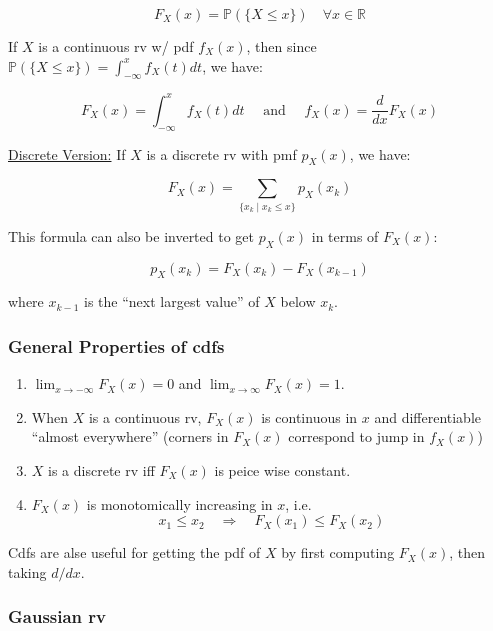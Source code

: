 \documentclass{article}
\begin{document}
\begin{equation}
  \tag{Cdf Definition: Continuous}
  \boxed{
    F_X(x) = \mathbb{P}(\{X\leq x\}) \quad \forall x \in \mathbb{R}
  }
\end{equation}

If $X$ is a continuous rv w/ pdf $f_X(x)$, then since
$\mathbb{P}(\{X\leq x\}) = \int_{-\infty}^x f_X(t)dt$, we have:

\[
  F_X(x) = \int_{-\infty}^x f_X(t)dt \quad \text{ and } \quad
  f_X(x) = \frac{d}{dx} F_X(x)
\]

\underline{Discrete Version:} If $X$ is a discrete rv with pmf $p_X(x)$,
we have:

\begin{equation}
  \tag{Cdf Definition: Discrete}
  \boxed{
    F_X(x) = \sum_{\{x_k \mid x_k \leq x\}} p_X(x_k)
  }
\end{equation}

This formula can also be inverted to get $p_X(x)$ in terms of
$F_X(x)$:

\[
  p_X(x_k) = F_X(x_k) - F_X(x_{k-1})
\]

where $x_{k-1}$ is the ``next largest value'' of $X$ below $x_k$.

\subsubsection{General Properties of cdfs}

\begin{enumerate}
\item $\lim_{x\to-\infty}F_X(x) = 0$ and $\lim_{x\to\infty}F_X(x) = 1$.
  
\item When $X$ is a continuous rv, $F_X(x)$ is continuous in $x$ and
  differentiable ``almost everywhere'' (corners in $F_X(x)$ correspond
  to jump in $f_X(x)$)

\item $X$ is a discrete rv iff $F_X(x)$ is peice wise constant.

\item $F_X(x)$ is monotomically increasing in $x$, i.e.
  \[
    x_1 \leq x_2 \quad \Rightarrow \quad F_X(x_1) \leq F_X(x_2)
  \]
\end{enumerate}

Cdfs are alse useful for getting the pdf of $X$ by first computing
$F_X(x)$, then taking $d/dx$.

\subsubsection{Gaussian rv}
\end{document}
